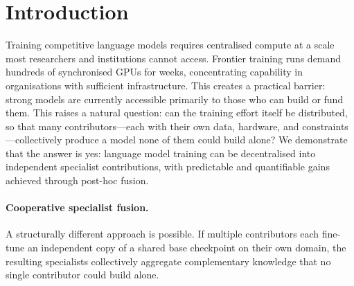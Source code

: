 \documentclass{article}
\begin{document}
\begin{abstract}
Three structural conditions govern the protocol. \emph{Shared initialisation} is necessary:
mismatched checkpoints degrade routing coherence, because the representational geometry
that enables clean routing is established at initialisation, not during training.
\emph{Layer freezing} is beneficial only beyond approximately 10,000 specialist training
steps ($+2.4$pp advantage at 20,000 steps; unnecessary below that threshold).
\emph{Routing must be learned}: a trained linear router approaches the domain-level
oracle---a hypothetical router with perfect per-token domain knowledge---with a gap of
${<}10^{-5}$ nats (natural units of entropy; 1~nat $\approx$ 1.44~bits) at 410M scale,
while uniform weight averaging reduces performance by $1.2\%$ relative to the best
individual specialist.
Section~\ref{sec:method} formalises the protocol; Sections~\ref{sec:core}--\ref{sec:divergence_gain}
characterise these conditions empirically; Appendix~\ref{app:evalcorrection} details the evaluation protocol.
\end{abstract}

\section{Introduction}
\label{sec:intro}

Training competitive language models requires centralised compute at a scale most researchers and institutions cannot access. Frontier training runs demand hundreds of synchronised GPUs for weeks, concentrating capability in organisations with sufficient infrastructure. This creates a practical barrier: strong models are currently accessible primarily to those who can build or fund them. This raises a natural question: can the training effort itself be distributed, so that many contributors---each with their own data, hardware, and constraints---collectively produce a model none of them could build alone? We demonstrate that the answer is yes: language model training can be decentralised into independent specialist contributions, with predictable and quantifiable gains achieved through post-hoc fusion.

\paragraph{Cooperative specialist fusion.} A structurally different approach is possible. If multiple contributors each fine-tune an independent copy of a shared base checkpoint on their own domain, the resulting specialists collectively aggregate complementary knowledge that no single contributor could build alone.
\end{document}
